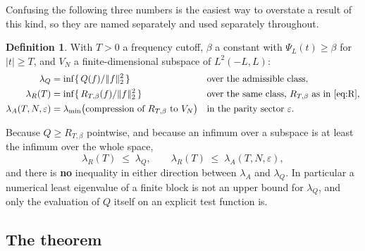 \documentclass[11pt,a4paper]{article}
\theoremstyle{definition}
\newtheorem{definition}[theorem]{Definition}
\theoremstyle{remark}
\newcommand{\lQ}{\lambda_{Q}}
\newcommand{\lR}{\lambda_{R}}
\newcommand{\lA}{\lambda_{A}}
\newcommand{\PsiL}{\Psi_{L}}
\begin{document}
Confusing the following three numbers is the easiest way to overstate a result
of this kind, so they are named separately and used separately throughout.

\begin{definition}
\label{def:three}
With $T > 0$ a frequency cutoff, $\beta$ a constant with $\PsiL(t) \ge \beta$
for $|t| \ge T$, and $V_N$ a finite-dimensional subspace of $L^2(-L,L)$:
\begin{align*}
  \lQ      &= \inf\{\,Q(f)/\|f\|_2^2 \,\}
             && \text{over the admissible class,}\\
  \lR(T)   &= \inf\{\,R_{T,\beta}(f)/\|f\|_2^2 \,\}
             && \text{over the same class, } R_{T,\beta} \text{ as in \eqref{eq:R},}\\
  \lA(T,N,\varepsilon) &= \lambda_{\min}\big(\text{compression of } R_{T,\beta} \text{ to } V_N\big)
             && \text{in the parity sector } \varepsilon .
\end{align*}
\end{definition}

\noindent Because $Q \ge R_{T,\beta}$ pointwise, and because an infimum over a
subspace is at least the infimum over the whole space,
\[
   \lR(T) \;\le\; \lQ , \qquad \lR(T) \;\le\; \lA(T,N,\varepsilon) ,
\]
and there is \textbf{no} inequality in either direction between $\lA$ and $\lQ$.
In particular a numerical least eigenvalue of a finite block is not an upper
bound for $\lQ$, and only the evaluation of $Q$ itself on an explicit test
function is.

\subsection{The theorem}
\end{document}
